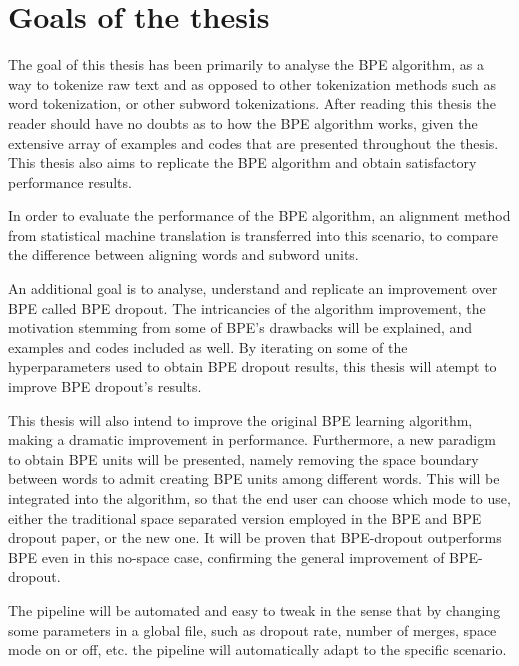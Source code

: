 %
%

\chapter{Goals of the thesis}

The goal of this thesis has been primarily to analyse the BPE algorithm, as a way to tokenize raw text and as opposed to other tokenization methods such as word tokenization, or other subword tokenizations. After reading this thesis the reader should have no doubts as to how the BPE algorithm works, given the extensive array of examples and codes that are presented throughout the thesis. This thesis also aims to replicate the BPE algorithm and obtain satisfactory performance results.

In order to evaluate the performance of the BPE algorithm, an alignment method from statistical machine translation is transferred into this scenario, to compare the difference between aligning words and subword units.

An additional goal is to analyse, understand and replicate an improvement over BPE called BPE dropout. The intricancies of the algorithm improvement, the motivation stemming from some of BPE's drawbacks will be explained, and examples and codes included as well. By iterating on some of the hyperparameters used to obtain BPE dropout results, this thesis will atempt to improve BPE dropout's results.

This thesis will also intend to improve the original BPE learning algorithm, making a dramatic improvement in performance. Furthermore, a new paradigm to obtain BPE units will be presented, namely removing the space boundary between words to admit creating BPE units among different words. This will be integrated into the algorithm, so that the end user can choose which mode to use, either the traditional space separated version employed in the BPE and BPE dropout paper, or the new one. It will be proven that BPE-dropout outperforms BPE even in this no-space case, confirming the general improvement of BPE-dropout.

The pipeline will be automated and easy to tweak in the sense that by changing some parameters in a global file, such as dropout rate, number of merges, space mode on or off, etc. the pipeline will automatically adapt to the specific scenario.
